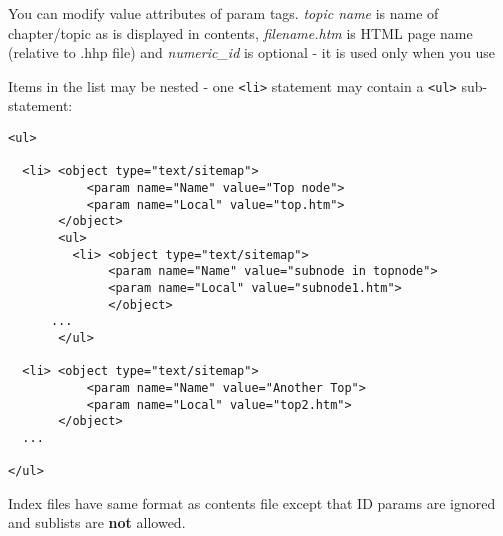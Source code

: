 You can modify value attributes of param tags. {\it topic name} is name of chapter/topic as is displayed in
contents, {\it filename.htm} is HTML page name (relative to .hhp file) and {\it numeric\_id} is optional 
- it is used only when you use 

Items in the list may be nested - one {\tt <li>} statement may contain a {\tt <ul>} sub-statement:

\begin{verbatim}
<ul>

  <li> <object type="text/sitemap">
           <param name="Name" value="Top node">
           <param name="Local" value="top.htm">
       </object>
       <ul>
         <li> <object type="text/sitemap">
              <param name="Name" value="subnode in topnode">
              <param name="Local" value="subnode1.htm">
              </object>
      ...
       </ul>
       
  <li> <object type="text/sitemap">
           <param name="Name" value="Another Top">
           <param name="Local" value="top2.htm">
       </object>
  ...    

</ul>
\end{verbatim}


Index files have same format as contents file except that ID params are ignored and sublists are {\bf not} 
allowed.

